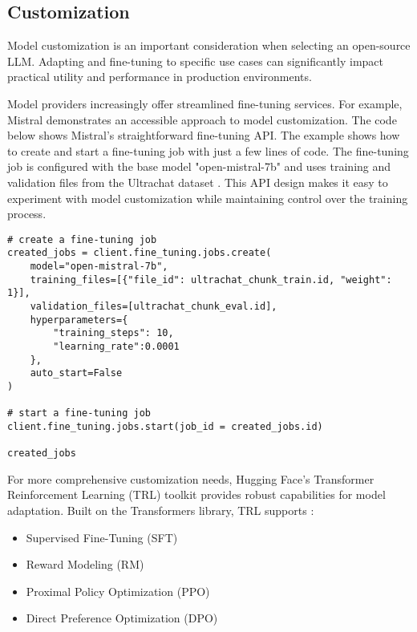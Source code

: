 \subsection{Customization}

Model customization is an important consideration when selecting an open-source LLM. Adapting and fine-tuning to specific use cases can significantly impact practical utility and performance in production environments.

Model providers increasingly offer streamlined fine-tuning services. For example, Mistral demonstrates an accessible approach to model customization.
The code below shows Mistral's straightforward fine-tuning API. The example shows how to create and start a fine-tuning job with just a few lines of code. The fine-tuning job is configured with the base model "open-mistral-7b" and uses training and validation files from the Ultrachat dataset . This API design makes it easy to experiment with model customization while maintaining control over the training process.

\begin{verbatim}
# create a fine-tuning job
created_jobs = client.fine_tuning.jobs.create(
    model="open-mistral-7b", 
    training_files=[{"file_id": ultrachat_chunk_train.id, "weight": 1}],
    validation_files=[ultrachat_chunk_eval.id], 
    hyperparameters={
        "training_steps": 10,
        "learning_rate":0.0001
    },
    auto_start=False
)

# start a fine-tuning job
client.fine_tuning.jobs.start(job_id = created_jobs.id)

created_jobs
\end{verbatim}

For more comprehensive customization needs, Hugging Face's Transformer Reinforcement Learning (TRL) toolkit provides robust capabilities for model adaptation. Built on the Transformers library, TRL supports :

\begin{itemize}
    \item Supervised Fine-Tuning (SFT)
    \item Reward Modeling (RM)
    \item Proximal Policy Optimization (PPO)
    \item Direct Preference Optimization (DPO)
\end{itemize}

